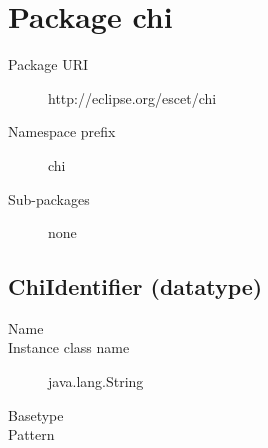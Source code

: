 
\newcommand{\hook}{\hspace*{5pt}\raisebox{2.5pt}{$\llcorner$}}

\section{Package chi}\label{chipkg:chi}
\pkgdocuchi

\begin{description}
\item[Package URI] http://eclipse.org/escet/chi
\item[Namespace prefix] chi
\item[Sub-packages] none
\end{description}

\subsection{ChiIdentifier (datatype)}\label{chiclass:ChiIdentifier}
\dtypedocuChiIdentifier

\begin{description}
\item[Name]
\item[Instance class name] java.lang.String
\item[Basetype]
\item[Pattern] \verb@@
\end{description}


